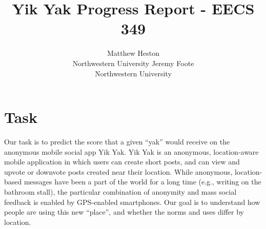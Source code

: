 \documentclass{sigchi}
\begin{document}
\title{Yik Yak Progress Report - EECS 349}

 \author{ \alignauthor Matthew Heston\\ Northwestern
University \alignauthor Jeremy Foote\\ Northwestern University }

\toappear{} \maketitle



\section{Task}

Our task is to predict the score that a given ``yak'' would receive on the
anonymous mobile social app Yik Yak. Yik Yak is an anonymous, location-aware
mobile application in which users can create short posts, and can view and
upvote or downvote posts created near their location. While anonymous,
location-based messages have been a part of the world for a long time (e.g.,
writing on the bathroom stall), the particular combination of anonymity and mass
social feedback is enabled by GPS-enabled smartphones. Our goal is to understand
how people are using this new ``place'', and whether the norms and uses differ
by location.
\end{document}
